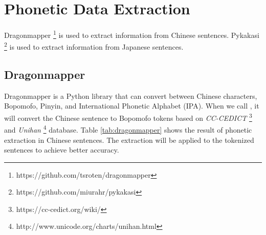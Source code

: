 \newpage

\section{Phonetic Data Extraction} \label{sec:phonetic_data}

Dragonmapper \footnote{https://github.com/tsroten/dragonmapper} is used to extract information from Chinese sentences. Pykakasi \footnote{https://github.com/miurahr/pykakasi} is used to extract information from Japanese sentences.

\subsection{Dragonmapper} \label{sec:dragonmapper}

Dragonmapper is a Python library that can convert between Chinese characters, Bopomofo, Pinyin, and International Phonetic Alphabet (IPA). When we call , it will convert the Chinese sentence to Bopomofo tokens based on \textit{CC-CEDICT} \footnote{https://cc-cedict.org/wiki/} and \textit{Unihan} \footnote{http://www.unicode.org/charts/unihan.html} database. Table \ref{tab:dragonmapper} shows the result of phonetic extraction in Chinese sentences. The extraction will be applied to the tokenized sentences to achieve better accuracy.

\vspace{0.2cm}

